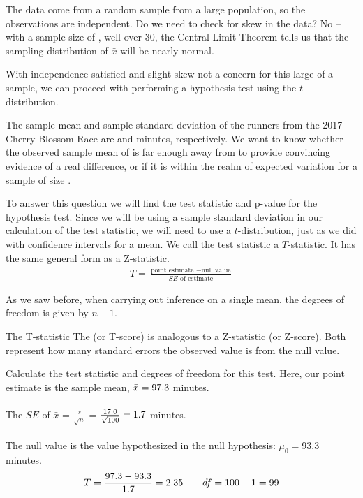 The data come from a random sample from a large population, so the observations are independent. Do we need to check for skew in the data? No -- with a sample size of \cherryblossomn{}, well over 30, the Central Limit Theorem tells us that the sampling distribution of $\bar{x}$ will be nearly normal.

With independence satisfied and slight skew not a concern for this large of a sample, we can proceed with performing a hypothesis test using the $t$-distribution.

The sample mean and sample standard deviation of the \cherryblossomn{} runners from the 2017 Cherry Blossom Race are \cherryblossommean{} and \cherryblossomsd{} minutes, respectively. We want to know whether the observed sample mean of \cherryblossommean{} is far enough away from \cherryblossomnull{} to provide convincing evidence of a real difference, or if it is within the realm of expected variation for a sample of size \cherryblossomn{}.  

To answer this question we will find the test statistic and p-value for the hypothesis test.  Since we will be using a sample standard deviation in our calculation of the test statistic, we will need to use a $t$-distribution, just as we did with confidence intervals for a mean.  We call the test statistic a $T$-statistic.  It has the same general form as a Z-statistic.
\begin{align*}
T = \frac{\text{point estimate } - \text{null value}}{SE\text{ of estimate}}
\end{align*}

As we saw before, when carrying out inference on a single mean, the degrees of freedom is given by $n-1$.  


\begin{onebox}{The T-statistic}
The  (or T-score) is analogous to a Z-statistic (or Z-score).  Both represent how many standard errors the observed value is from the null value.
\end{onebox}


\begin{examplewrap}
\begin{nexample}{Calculate the test statistic and degrees of freedom for this test.}
Here, our point estimate is the sample mean, $\bar{x}=97.3{}$ minutes.  
\\
\\
The $SE$ of $\bar{x}$ = $\frac{s}{\sqrt{n}}$ = $\frac{17.0{}}{ \sqrt{100{}}} = 1.7{}$ minutes.
\\
\\
The null value is the value hypothesized in the null hypothesis: $\mu_0 = 93.3$ minutes.
\begin{align*}
 T = \frac{97.3{} - 93.3{}}{1.7{}} = 2.35{} \qquad df=100{}-1=99
\end{align*}
\end{nexample}
\end{examplewrap}


